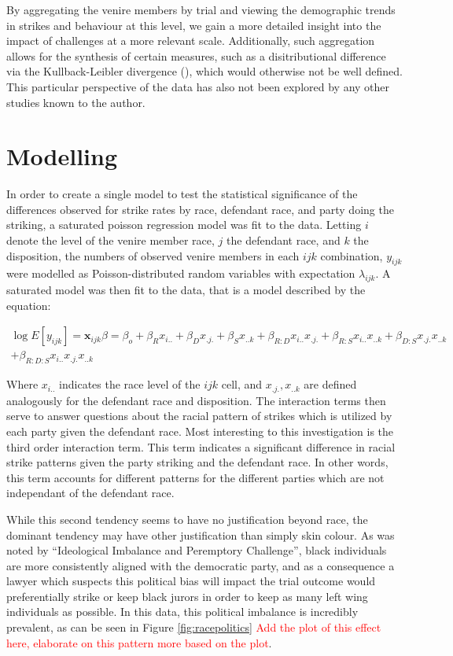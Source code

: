 By aggregating the venire members by trial and viewing the demographic trends in strikes and behaviour at this level, we gain a
more detailed insight into the impact of challenges at a more relevant scale. Additionally, such aggregation allows for the
synthesis of certain measures, such as a disitributional difference via the Kullback-Leibler divergence (\cite{kullback1951}),
which would otherwise not be well defined. This particular perspective of the data has also not been explored by any other studies
known to the author.

\section{Modelling} \label{sec:mods}

In order to create a single model to test the statistical significance of the differences observed for strike rates by race,
defendant race, and party doing the striking, a saturated poisson regression model was fit to the data. Letting $i$ denote the
level of the venire member race, $j$ the defendant race, and $k$ the disposition, the numbers of observed venire members in each
$ijk$ combination, $y_{ijk}$ were modelled as Poisson-distributed random variables with expectation $\lambda_{ijk}$. A saturated
model was then fit to the data, that is a model described by the equation:

\begin{multline}
  \log{E[y_{ijk}]} = \textbf{x}_{ijk}\beta = \beta_o + \beta_R x_{i..}  + \beta_{D} x_{.j.} + \beta_S x_{..k} +\beta_{R:D}x_{i..}
  x_{.j.} + \beta_{R:S} x_{i..} x_{..k} +\beta_{D:S} x_{.j.}x_{..k} \\+ \beta_{R:D:S} x_{i..} x_{.j.} x_{..k}
\end{multline}

Where $x_{i..}$ indicates the race level of the $ijk$ cell, and $x_{.j.},x_{..k}$ are defined analogously for the defendant race
and disposition. The interaction terms then serve to answer questions about the racial pattern of strikes which is utilized by
each party given the defendant race. Most interesting to this investigation is the third order interaction term. This term
indicates a significant difference in racial strike patterns given the party striking and the defendant race. In other words, this
term accounts for different patterns for the different parties which are not independant of the defendant race.

While this second tendency seems to have no justification beyond race, the dominant tendency may have other justification than
simply skin colour. As was noted by ``Ideological Imbalance and Peremptory Challenge'', black individuals are more consistently
aligned with the democratic party, and as a consequence a lawyer which suspects this political bias will impact the trial outcome
would preferentially strike or keep black jurors in order to keep as many left wing individuals as possible. In this data, this
political imbalance is incredibly prevalent, as can be seen in Figure \ref{fig:racepolitics} \textcolor{red}{Add the plot of this
  effect here, elaborate on this pattern more based on the plot}.

